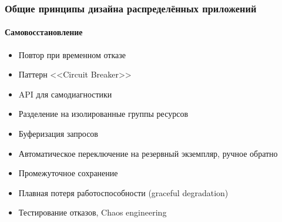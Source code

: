 \documentclass{../cscslides}
\begin{document}
    \begin{frame}
        \frametitle{Общие принципы дизайна распределённых приложений}
        \framesubtitle{Самовосстановление}
        \begin{itemize}
            \item Повтор при временном отказе
            \item Паттерн <<Circuit Breaker>>
            \item API для самодиагностики
            \item Разделение на изолированные группы ресурсов
            \item Буферизация запросов
            \item Автоматическое переключение на резервный экземпляр, ручное обратно
            \item Промежуточное сохранение
            \item Плавная потеря работоспособности (graceful degradation)
            \item Тестирование отказов, Chaos engineering
        \end{itemize}
    \end{frame}
\end{document}
